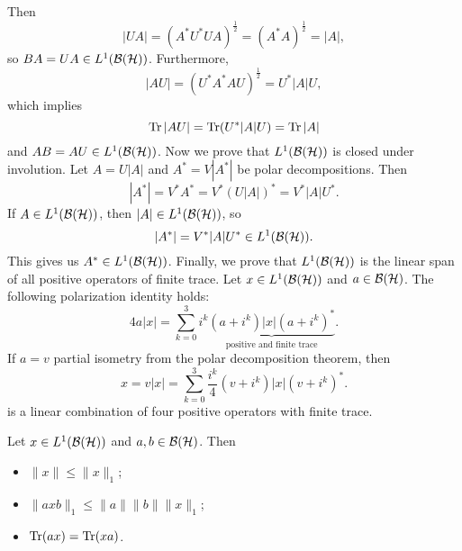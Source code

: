 \begin{myproof}
  Then 
  $$|UA| = (A^* U^* U A)^{\frac{1}{2}} = (A^* A)^{\frac{1}{2}} = |A|,$$
  so $BA = UA \in L^1 (\operatorname{\mathcal{B} (\mathcal{H})})$. Furthermore,
  $$|AU| = (U^* A^* A U)^{\frac{1}{2}} = U^* |A| U,$$
  which implies 
  $$\operatorname{Tr} |AU| = \operatorname{Tr} (U^* |A| U) = \operatorname{Tr} |A|$$
  and $AB = AU \in L^1 (\operatorname{\mathcal{B} (\mathcal{H})})$.
  Now we prove that $L^1 (\operatorname{\mathcal{B} (\mathcal{H})})$ is closed under involution.
  Let $A = U |A|$ and $A^* = V |A^*|$ be polar decompositions. Then 
  $$|A^*| = V^* A^* = V^* (U |A|)^* = V^* |A| U^*.$$
  If $A \in L^1 (\operatorname{\mathcal{B} (\mathcal{H})})$, then $|A| \in L^1 (\operatorname{\mathcal{B} (\mathcal{H})})$, so 
  $$|A^*| = V^* |A| U^* \in L^1 (\operatorname{\mathcal{B} (\mathcal{H})}).$$ This gives us $A^* \in L^1 (\operatorname{\mathcal{B} (\mathcal{H})})$.
  Finally, we prove that $L^1 (\operatorname{\mathcal{B} (\mathcal{H})})$ is the linear span of all positive operators of finite trace.
  Let $x \in L^1 (\operatorname{\mathcal{B} (\mathcal{H})})$ and $a \in \operatorname{\mathcal{B} (\mathcal{H})}$. The following polarization identity holds:
  $$4 a |x| = \sum_{k = 0} ^3 i^k \underbrace{(a + i^k) |x| (a + i^k)^*}_{\textrm{positive and finite trace}}.$$
  If $a = v$ partial isometry from the polar decomposition theorem, then 
  $$x = v |x| = \sum_{k = 0} ^3 \frac{i^k}{4} {(v + i^k) |x| (v + i^k)^*}.$$
  is a linear combination of four positive operators with finite trace.
\end{myproof}

\begin{proposition}
  Let $x \in L^1 (\operatorname{\mathcal{B} (\mathcal{H})})$ and $a, b \in \operatorname{\mathcal{B} (\mathcal{H})}$. Then 
  \begin{itemize}
    \item $\| x\| \leq \|x\|_1$;
    \item $\| axb\|_1 \leq \| a\| \|b\| \|x\|_1$;
    \item $\operatorname{Tr} (ax) = \operatorname{Tr} (xa)$.
  \end{itemize}
\end{proposition}

